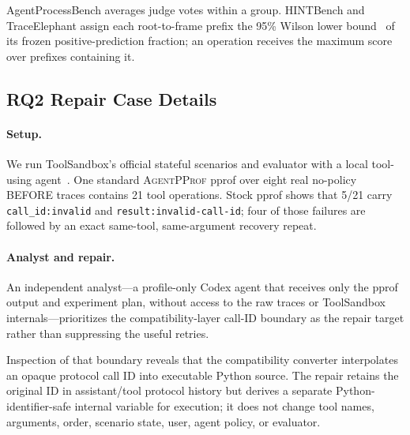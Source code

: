 \documentclass[letterpaper]{article}
\newcommand{\sys}{\textsc{AgentPProf}\xspace}
\begin{document}
AgentProcessBench averages judge votes within a group. HINTBench and
TraceElephant assign each root-to-frame prefix the 95\% Wilson lower
bound~\cite{wilson1927} of its frozen positive-prediction fraction; an
operation receives the maximum score over prefixes containing it.

\subsection{RQ2 Repair Case Details}
\label{app:rq2-repair}

\paragraph{Setup.}
We run ToolSandbox's official stateful scenarios and evaluator with a local
tool-using agent~\cite{toolsandbox}.
One standard \sys pprof over eight real no-policy BEFORE traces contains 21
tool operations. Stock pprof shows that 5/21 carry \texttt{call\_id:invalid}
and \texttt{result:invalid-call-id}; four of those failures are followed by an
exact same-tool, same-argument recovery repeat.

\paragraph{Analyst and repair.}
An independent analyst---a profile-only Codex agent that receives only the
pprof output and experiment plan, without access to the raw traces or
ToolSandbox internals---prioritizes the compatibility-layer call-ID boundary
as the repair target rather than suppressing the useful retries.

Inspection of that boundary reveals that the compatibility converter
interpolates an opaque protocol call ID into executable Python source. The
repair retains the original ID in assistant/tool protocol history but derives
a separate Python-identifier-safe internal variable for execution; it does not
change tool names, arguments, order, scenario state, user, agent policy, or
evaluator.
\end{document}
